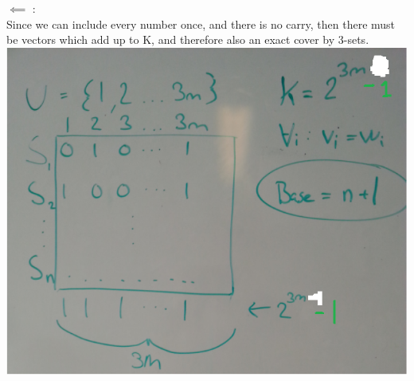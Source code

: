 $\impliedby$ :\\ Since we can include every number once, and there is no carry, then there must be vectors which add up to K, and therefore also an exact cover by 3-sets.
\includegraphics[scale=0.5]{knapsack}
\newpage


